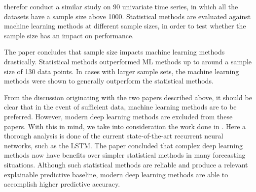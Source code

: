 \cite{Cerqueira2019} therefor conduct a similar study on 90 univariate time series, in which
all the datasets have a sample size above 1000.
Statistical methods are evaluated against machine learning methods at different sample sizes,
in order to test whether the sample size has an impact on performance.

The paper \cite{Cerqueira2019} concludes that sample size impacts machine learning methods drastically.
Statistical methods outperformed ML methods up to around a sample size of 130 data points.
In cases with larger sample sets, the machine learning methods were shown to generally outperform the statistical methods.


\iffalse
  This is good news for us, as our datasets do have a sample size of well above 660 at this moment.
  Depending on when we conduct the experiment, the number will grow to the range of 1000 to 1200,
  as data is being gathered every day as we speak.
  \todo[inline]{Should this be described when we don't describe out data? Should have section with data information if we are to inluce this!}

  One drawback of the \cite{Makridakis2018} study is that it does not test any of our chosen ML methods.
  They tested:
  \begin{itemize}
    \item \textit{A rule-based model (RBR)}
    \item \textit{A random Forest method (RF)}
    \item \textit{Guassion Process regression (GP)}
    \item \textit{The Multivariate adative regression (MARS)}
    \item \textit{Generalized linear model (GLM)}
  \end{itemize}
\fi


From the discussion originating with the two papers described above,
it should be clear that in the event of sufficient data, machine learning methods are to be preferred.
However, modern deep learning methods are excluded from these papers.
With this in mind, we take into consideration the work done in \cite{Hewamalage2021}.
Here a thorough analysis is done of the current state-of-the-art recurrent neural networks, such as the LSTM.
The paper concluded that complex deep learning methods now have benefits over simpler statistical methods in many forecasting situations.
Although such statistical methods are reliable and produce a relevant explainable predictive baseline,
modern deep learning methods are able to accomplish higher predictive accuracy.


